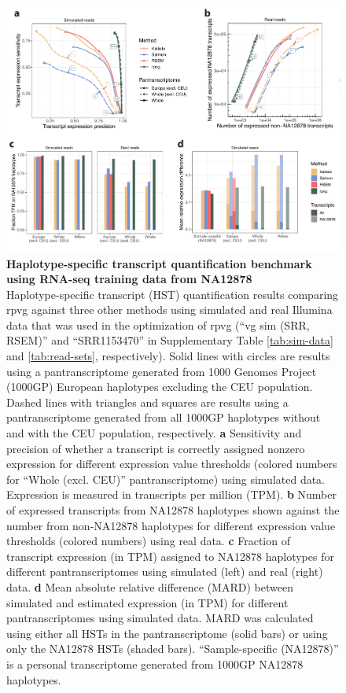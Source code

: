 \documentclass[11pt]{ucthesis}
\begin{document}
\begin{figure}[H]
\begin{center}
\includegraphics[width=\textwidth]{mpmapfigures/figureS9.pdf}
\caption{\textbf{Haplotype-specific transcript quantification benchmark using RNA-seq training data from NA12878} \\
Haplotype-specific transcript (HST) quantification results comparing rpvg against three other methods using simulated and real Illumina data that was used in the optimization of rpvg (``vg sim (SRR, RSEM)'' and ``SRR1153470'' in Supplementary Table \ref{tab:sim-data} and \ref{tab:read-sets}, respectively). Solid lines with circles are results using a pantranscriptome generated from 1000 Genomes Project (1000GP) European haplotypes excluding the CEU population. Dashed lines with triangles and squares are results using a pantranscriptome generated from all 1000GP haplotypes without and with the CEU population, respectively. \textbf{a} Sensitivity and precision of whether a transcript is correctly assigned nonzero expression for different expression value thresholds (colored numbers for ``Whole (excl. CEU)'' pantranscriptome) using simulated data. Expression is measured in transcripts per million (TPM). \textbf{b} Number of expressed transcripts from NA12878 haplotypes shown against the number from non-NA12878 haplotypes for different expression value thresholds (colored numbers) using real data. \textbf{c} Fraction of transcript expression (in TPM) assigned to NA12878 haplotypes for different pantranscriptomes using simulated (left) and real (right) data. \textbf{d} Mean absolute relative difference (MARD) between simulated and estimated expression (in TPM) for different pantranscriptomes using simulated data. MARD was calculated using either all HSTs in the pantranscriptome (solid bars) or using only the NA12878 HSTs (shaded bars). ``Sample-specific (NA12878)'' is a personal transcriptome generated from 1000GP NA12878 haplotypes.
} \label{fig:expression-srr}
\end{center}
\end{figure}
 
\end{document}
